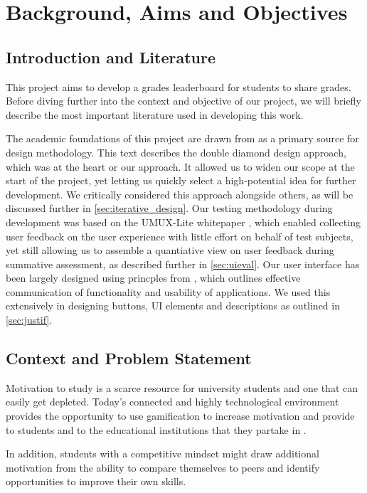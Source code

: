 \section{Background, Aims and Objectives}

\subsection{Introduction and Literature}\label{sec:introlit}
This project aims to develop a grades leaderboard for students to share grades. Before diving further into the context and objective of our project, we will briefly describe the most important literature used in developing this work.

The academic foundations of this project are drawn from \cite{interaction_design} as a primary source for design methodology. This text describes the double diamond design approach, which was at the heart or our approach. It allowed us to widen our scope at the start of the project, yet letting us quickly select a high-potential idea for further development. We critically considered this approach alongside others, as will be discussed further in \cref{sec:iterative_design}. 
Our testing methodology during development was based on the UMUX-Lite whitepaper \cite{lewis}, which enabled collecting user feedback on the user experience with little effort on behalf of test subjects, yet still allowing us to assemble a quantiative view on user feedback during summative assessment, as described further in \cref{sec:uieval}.
Our user interface has been largely designed using princples from \cite{mckay_2013}, which outlines effective communication of functionality and usability of applications. We used this extensively in designing buttons, UI elements and descriptions as outlined in \cref{sec:justif}.

\subsection{Context and Problem Statement} \label{sec:prob}
Motivation to study is a scarce resource for university students and one that can easily get depleted. Today’s connected and highly technological environment provides the opportunity to use gamification to increase motivation and provide to students and to the educational institutions that they partake in \cite{garciacabot_measuring_2020} \cite{lister_gamification:_2015}. 

In addition, students with a competitive mindset might draw additional motivation from the ability to compare themselves to peers and identify opportunities to improve their own skills.

